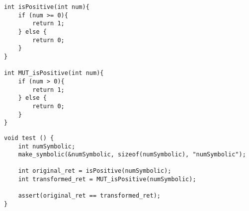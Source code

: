 \begin{lstlisting}[style=CStyle, caption=isPositive and MUT\_isPositive functions, label=function]
int isPositive(int num){
	if (num >= 0){
		return 1;
	} else {
		return 0;
	}
}

int MUT_isPositive(int num){
	if (num > 0){
		return 1;
	} else {
		return 0;
	}
}

\end{lstlisting}

\begin{lstlisting}[style=CStyle, caption=Holling's approach for test case generation., label=example]
void test () { 
	int numSymbolic; 
	make_symbolic(&numSymbolic, sizeof(numSymbolic), "numSymbolic"); 
 	
 	int original_ret = isPositive(numSymbolic); 
	int transformed_ret = MUT_isPositive(numSymbolic); 
 
	assert(original_ret == transformed_ret); 
}
\end{lstlisting}